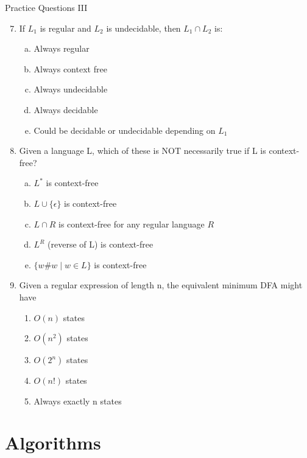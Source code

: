 \documentclass{beamer}
\begin{document}
\begin{frame}[t]{Practice Questions III}
    \begin{enumerate}
        \setcounter{enumi}{6}
        \item If $L_1$ is regular and $L_2$ is undecidable, then $L_1\cap L_2$ is:
            \begin{enumerate}[(a)]
                \item Always regular
                \item Always context free
                \item Always undecidable 
                \item Always decidable
                \item Could be decidable or undecidable depending on $L_1$ %
            \end{enumerate}
        \pause \item Given a language L, which of these is NOT necessarily true if L is context-free?
            \begin{enumerate}[(a)]
                \item $L^*$ is context-free
                \item $L \cup \{\epsilon\}$ is context-free
                \item $L\cap R$ is context-free for any regular language $R$
                \item $L^R$ (reverse of L) is context-free
                \item $\{w\#w \mid w \in L\}$ is context-free %
            \end{enumerate}
        \pause \item Given a regular expression of length n, the equivalent minimum DFA might have
            \begin{enumerate}
                \item $O(n)$ states
                \item $O(n^2)$ states
                \item $O(2^n)$ states %
                \item $O(n!)$ states
                \item Always exactly n states
            \end{enumerate}
    \end{enumerate}
\end{frame}


\section{Algorithms}
\end{document}
